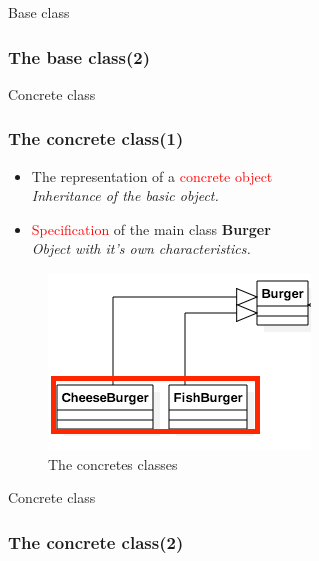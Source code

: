 \documentclass{beamer}
\begin{document}
  \begin{frame}{Base class}
    \frametitle{The base class(2)}
    
  \end{frame}

  \begin{frame}{Concrete class}
    \frametitle{The concrete class(1)}
    \begin{itemize}
      \item The representation of a \textcolor{red}{concrete object} \\
      \textit{Inheritance of the basic object.}
      \item \textcolor{red}{Specification} of the main class \textbf{Burger} \\
      \textit{Object with it's own characteristics.}
    \end{itemize}
    \begin{figure}[!b]
      \centering
      \includegraphics[scale=0.4]{concrete}
      \caption{The concretes classes}
    \end{figure}
  \end{frame}

  \begin{frame}{Concrete class}
    \frametitle{The concrete class(2)}
    
  \end{frame}
\end{document}
